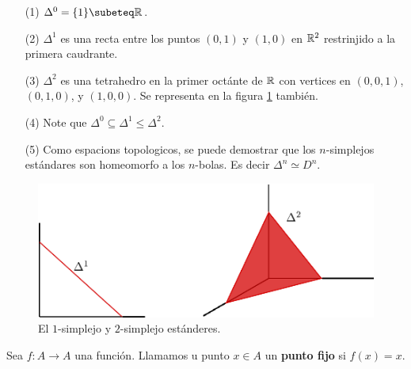 \begin{example}\label{exmp_2}
    \begin{enumerate}
        \item[(1)] $\Delta^0=\{1\} \subeteq \R$.

        \item[(2)] $\Delta^1$ es una recta entre los puntos $(0,1)$ y $(1,0)$ en
            $\mathbb{R}^2$ restrinjido a la primera caudrante.

        \item[(3)] $\Delta^2$ es una tetrahedro en la primer oct\'ante de  $\mathbb{R}$
            con vertices en  $(0,0,1)$, $(0,1,0)$, y $(1,0,0)$. Se representa en
            la figura \ref{fig_1} tambi\'en.

        \item[(4)] Note que $\Delta^0 \subseteq \Delta^1 \leq \Delta^2$.

        \item[(5)] Como espacions topologicos, se puede demostrar que los
            $n$-simplejos est\'andares son homeomorfo a los  $n$-bolas. Es decir
             $\Delta^n \simeq D^n$.
    \end{enumerate}
\end{example}

\begin{figure}[h]
    \centering
    \includegraphics[scale=0.5]{Figures/standaard_simplices.eps}
    \caption{El $1$-simplejo y  $2$-simplejo est\'anderes.}
    \label{fig_1}
\end{figure}

\begin{definition}
    Sea $f:A \rightarrow A$ una funci\'on. Llamamos u punto $x \in A$ un
    \textbf{punto fijo} si $f(x)=x$.
\end{definition}

